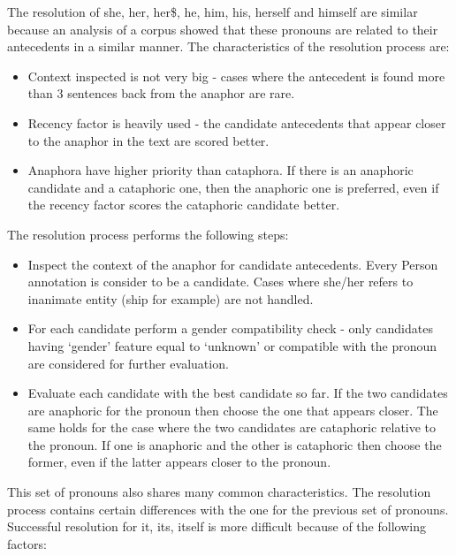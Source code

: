 The resolution of she, her, her\$, he, him, his, herself and himself
are similar because an analysis of a corpus showed that these
pronouns are related to their antecedents in a similar manner. The
characteristics of the resolution process are:

  \begin{itemize}
  \item
  Context inspected is not very big - cases where the antecedent is
  found more than 3 sentences back from the anaphor are rare.

  \item
  Recency factor is heavily used - the candidate antecedents that
  appear closer to the anaphor in the text are scored better.

  \item
  Anaphora have higher priority than cataphora. If there is an
  anaphoric candidate and a cataphoric one, then the anaphoric one is
  preferred, even if the recency factor scores the cataphoric
  candidate better.
  \end{itemize}

The resolution process performs the following steps:
  \begin{itemize}

  \item
  Inspect the context of the anaphor for candidate antecedents. Every
  Person annotation is consider to be a candidate. Cases where she/her
  refers to inanimate entity (ship for example) are not handled.

  \item
  For each candidate perform a gender compatibility check - only
  candidates having `gender' feature equal to `unknown' or compatible
  with the pronoun are considered for further evaluation.

  \item
  Evaluate each candidate with the best candidate so far. If the two
  candidates are anaphoric for the pronoun then choose the one that
  appears closer. The same holds for the case where the two candidates
  are cataphoric relative to the pronoun. If one is anaphoric and the
  other is cataphoric then choose the former, even if the latter
  appears closer to the pronoun.

  \end{itemize}



This set of pronouns also shares many common characteristics. The
resolution process contains certain differences with the one for the
previous set of pronouns. Successful resolution for it, its, itself is
more difficult because of the following factors:

